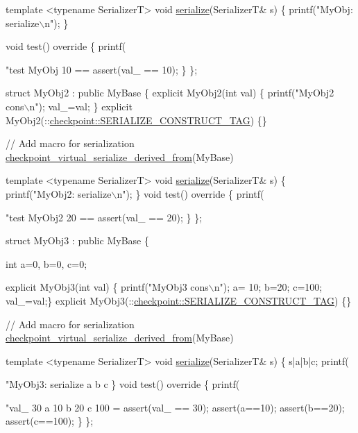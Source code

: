 \begin{DoxyCodeInclude}
{  \textcolor{keyword}{template} <\textcolor{keyword}{typename} SerializerT>
  \textcolor{keywordtype}{void} \hyperlink{namespacecheckpoint_a075da4e7344cf037943362517e606c3a}{serialize}(SerializerT& s) \{
    printf(\textcolor{stringliteral}{"MyObj: serialize\(\backslash\)n"});
  \}

  \textcolor{keywordtype}{void} test()\textcolor{keyword}{ override }\{
    printf(\textcolor{stringliteral}{"test MyObj 10 == %
    assert(val\_ == 10);
  \}
\};

\textcolor{keyword}{struct }MyObj2 : \textcolor{keyword}{public} MyBase \{
  \textcolor{keyword}{explicit} MyObj2(\textcolor{keywordtype}{int} val) \{ printf(\textcolor{stringliteral}{"MyObj2 cons\(\backslash\)n"}); val\_=val; \}
  \textcolor{keyword}{explicit} MyObj2(::\hyperlink{structcheckpoint_1_1dispatch_1_1_s_e_r_i_a_l_i_z_e___c_o_n_s_t_r_u_c_t___t_a_g}{checkpoint::SERIALIZE\_CONSTRUCT\_TAG}) \{\}

  \textcolor{comment}{// Add macro for serialization}
  \hyperlink{derived_8h_acc015406441054fae32d63af2b86ca0d}{checkpoint\_virtual\_serialize\_derived\_from}(MyBase)

  \textcolor{keyword}{template} <\textcolor{keyword}{typename} SerializerT>
  \textcolor{keywordtype}{void} \hyperlink{namespacecheckpoint_a075da4e7344cf037943362517e606c3a}{serialize}(SerializerT& s) \{
    printf(\textcolor{stringliteral}{"MyObj2: serialize\(\backslash\)n"});
  \}
  \textcolor{keywordtype}{void} test()\textcolor{keyword}{ override }\{
    printf(\textcolor{stringliteral}{"test MyObj2 20 == %
    assert(val\_ == 20);
  \}
\};

\textcolor{keyword}{struct }MyObj3 : \textcolor{keyword}{public} MyBase \{

  \textcolor{keywordtype}{int} a=0, b=0, c=0;

  \textcolor{keyword}{explicit} MyObj3(\textcolor{keywordtype}{int} val) \{ printf(\textcolor{stringliteral}{"MyObj3 cons\(\backslash\)n"}); a= 10; b=20; c=100; val\_=val;\}
  \textcolor{keyword}{explicit} MyObj3(::\hyperlink{structcheckpoint_1_1dispatch_1_1_s_e_r_i_a_l_i_z_e___c_o_n_s_t_r_u_c_t___t_a_g}{checkpoint::SERIALIZE\_CONSTRUCT\_TAG}) \{\}

  \textcolor{comment}{// Add macro for serialization}
  \hyperlink{derived_8h_acc015406441054fae32d63af2b86ca0d}{checkpoint\_virtual\_serialize\_derived\_from}(MyBase)

  \textcolor{keyword}{template} <\textcolor{keyword}{typename} SerializerT>
  \textcolor{keywordtype}{void} \hyperlink{namespacecheckpoint_a075da4e7344cf037943362517e606c3a}{serialize}(SerializerT& s) \{
    s|a|b|c;
    printf(\textcolor{stringliteral}{"MyObj3: serialize a b c %
  \}
  \textcolor{keywordtype}{void} test()\textcolor{keyword}{ override }\{
    printf(\textcolor{stringliteral}{"val\_ 30  a 10 b 20 c 100 = %
    assert(val\_ == 30);
    assert(a==10);
    assert(b==20);
    assert(c==100);
  \}
\};

}}}}}
\end{DoxyCodeInclude}
